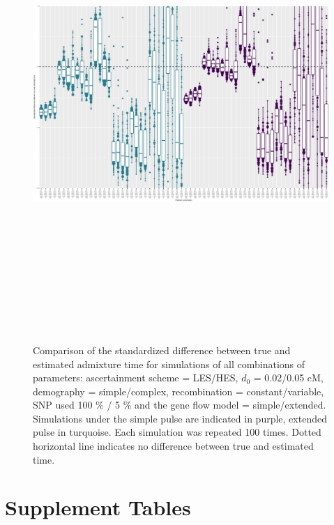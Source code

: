 \documentclass[11pt]{article}
\begin{document}
\begin{figure}
\centering
\includegraphics[width=16cm,height=18cm,keepaspectratio]{ATE_Revisions_files/figure-latex/figS2_updated_EP-1.pdf}
\caption{\label{fig:figSGLM_data} Comparison of the standardized difference between true and estimated admixture time for simulations of all combinations of parameters: ascertainment scheme = LES/HES,  $d_{0}$ = 0.02/0.05 cM, demography = simple/complex, recombination = constant/variable, SNP used 100 \% / 5 \% and the gene flow model = simple/extended. Simulations under the simple pulse are indicated in purple, extended pulse in turquoise. Each simulation was repeated 100 times. Dotted horizontal line indicates no difference between true and estimated time.}
\end{figure}

\section{Supplement Tables}
\end{document}
